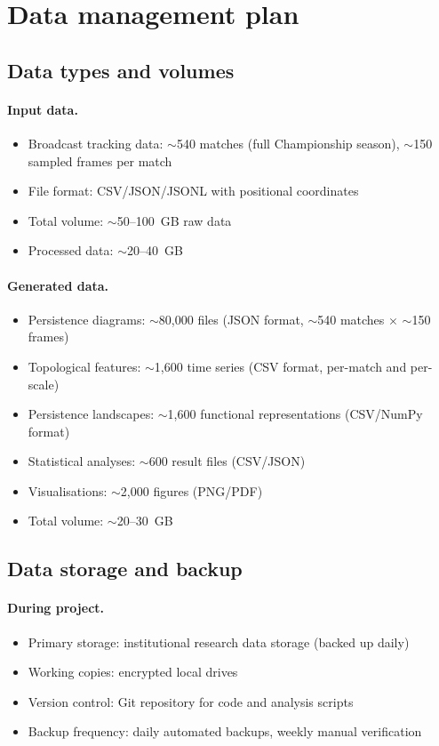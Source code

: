 \section{Data management plan}

\subsection{Data types and volumes}

\paragraph{Input data.}
\begin{itemize}
  \item Broadcast tracking data: $\sim$540 matches (full Championship season), $\sim$150 sampled frames per match
  \item File format: CSV/JSON/JSONL with positional coordinates
  \item Total volume: $\sim$50--100~GB raw data
  \item Processed data: $\sim$20--40~GB
\end{itemize}

\paragraph{Generated data.}
\begin{itemize}
  \item Persistence diagrams: $\sim$80{,}000 files (JSON format, $\sim$540 matches $\times$ $\sim$150 frames)
  \item Topological features: $\sim$1{,}600 time series (CSV format, per-match and per-scale)
  \item Persistence landscapes: $\sim$1{,}600 functional representations (CSV/NumPy format)
  \item Statistical analyses: $\sim$600 result files (CSV/JSON)
  \item Visualisations: $\sim$2{,}000 figures (PNG/PDF)
  \item Total volume: $\sim$20--30~GB
\end{itemize}

\subsection{Data storage and backup}

\paragraph{During project.}
\begin{itemize}
  \item Primary storage: institutional research data storage (backed up daily)
  \item Working copies: encrypted local drives
  \item Version control: Git repository for code and analysis scripts
  \item Backup frequency: daily automated backups, weekly manual verification
\end{itemize}

